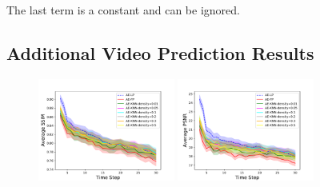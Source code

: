 \documentclass{article}
\begin{document}
The last term is a constant and can be ignored.


\subsection{Additional Video Prediction Results}

\begin{figure}
  \centering
  \includegraphics[width=0.4\textwidth]{images/bair_ae_comparison_ssim.pdf}
  \includegraphics[width=0.4\textwidth]{images/bair_ae_comparison_psnr.pdf}
  \caption{}
  \label{bair}
\end{figure}


%




%
%
\end{document}
